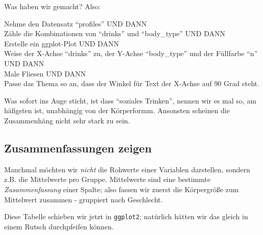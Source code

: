 \documentclass[12pt,]{book}
\newenvironment{Shaded}{\begin{snugshade}}{\end{snugshade}}
\newcommand{\KeywordTok}[1]{\textcolor[rgb]{0.13,0.29,0.53}{\textbf{{#1}}}}
\newcommand{\DataTypeTok}[1]{\textcolor[rgb]{0.13,0.29,0.53}{{#1}}}
\newcommand{\StringTok}[1]{\textcolor[rgb]{0.31,0.60,0.02}{{#1}}}
\newcommand{\CommentTok}[1]{\textcolor[rgb]{0.56,0.35,0.01}{\textit{{#1}}}}
\newcommand{\NormalTok}[1]{{#1}}
\let\BeginKnitrBlock\begin \let\EndKnitrBlock\end
\begin{document}
Was haben wir gemacht? Also:

\BeginKnitrBlock{rmdpseudocode}
Nehme den Datensatz ``profiles'' UND DANN\\
Zähle die Kombinationen von ``drinks'' und ``body\_type'' UND DANN\\
Erstelle ein ggplot-Plot UND DANN\\
Weise der X-Achse ``drinks'' zu, der Y-Achse ``body\_type'' und der
Füllfarbe ``n'' UND DANN\\
Male Fliesen UND DANN\\
Passe das Thema so an, dass der Winkel für Text der X-Achse auf 90 Grad
steht.
\EndKnitrBlock{rmdpseudocode}

Was sofort ins Auge sticht, ist dass ``soziales Trinken'', nennen wir es
mal so, am häfigsten ist, unabhängig von der Körperformm. Ansonsten
scheinen die Zusammenhäng nicht sehr stark zu sein.

\subsection{Zusammenfassungen zeigen}\label{zusammenfassungen-zeigen}

Manchmal möchten wir \emph{nicht} die Rohwerte einer Variablen
darstellen, sondern z.B. die Mittelwerte pro Gruppe. Mittelwerte sind
eine bestimmte \emph{Zusammenfassung} einer Spalte; also fassen wir
zuerst die Körpergröße zum Mittelwert zusammen - gruppiert nach
Geschlecht.

\begin{Shaded}
\end{Shaded}

Diese Tabelle schieben wir jetzt in \texttt{ggplot2}; natürlich hätten
wir das gleich in einem Rutsch durchpfeifen können.

\begin{Shaded}
\end{Shaded}
\end{document}
